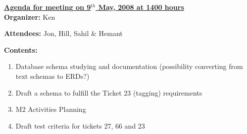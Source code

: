 \documentclass{letter}
\begin{document}
{\large \textbf{\underline{Agenda for meeting on 9$^{th}$ May, 2008 at 1400 hours}}}\\

\textbf{Organizer:} Ken

\textbf{Attendees:} Jon, Hill, Sahil \& Hemant

\textbf{Contents:}

\begin{enumerate}
	\item Database schema studying and documentation (possibility converting from text schemas to ERDs?)
	\item Draft a schema to fulfill the Ticket 23 (tagging) requirements
	\item M2 Activities Planning
	\item Draft test criteria for tickets 27, 66 and 23
\end{enumerate}
 
\end{document}
